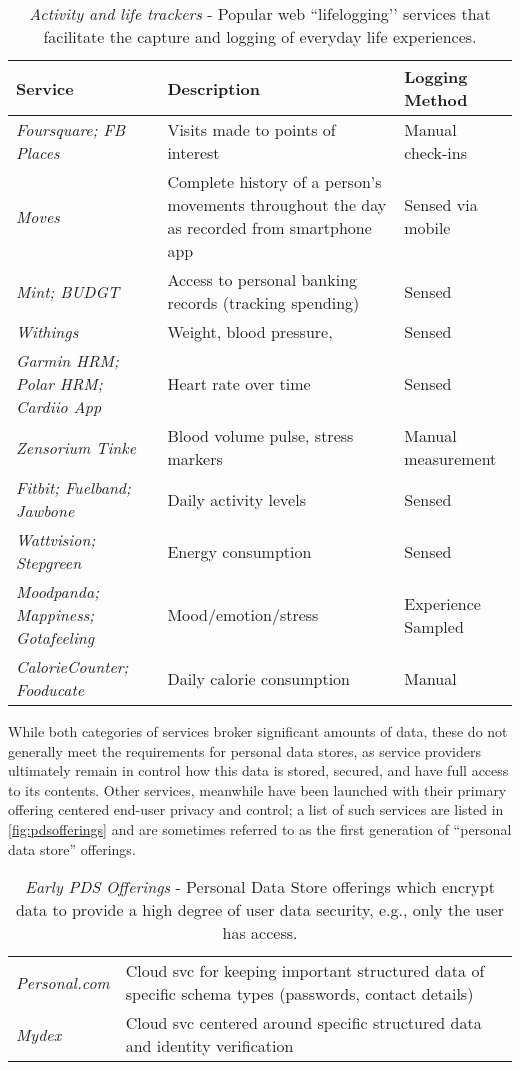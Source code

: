 \documentclass[graybox]{svmult}
\begin{document}
\begin{table}
\begin{tabular}{p{3cm} p{4.5cm} p{2.54cm}}
Service & Description & Logging Method \\
\hline
\emph{Foursquare; FB Places} & Visits made to points of interest & Manual check-ins \\
\emph{Moves} & Complete history of a person's movements throughout the day as recorded from smartphone app  & Sensed via mobile \\ 
\emph{Mint; BUDGT} & Access to personal banking records (tracking spending) & Sensed\\
\emph{Withings} & Weight, blood pressure,& Sensed \\
\emph{Garmin HRM; Polar HRM; Cardiio App} & Heart rate over time & Sensed \\
\emph{Zensorium Tinke} & Blood volume pulse, stress markers & Manual measurement \\
\emph{Fitbit; Fuelband; Jawbone} & Daily activity levels & Sensed \\ 
\emph{Wattvision; Stepgreen} & Energy consumption & Sensed \\
\emph{Moodpanda; Mappiness; Gotafeeling} & Mood/emotion/stress & Experience Sampled \\
\emph{CalorieCounter; Fooducate} & Daily calorie consumption & Manual \\
\end{tabular}
\caption{\emph{Activity and life trackers} - Popular web ``lifelogging’’ services that facilitate the capture and logging of everyday life experiences. }
\label{fig:aboutme}
\end{table}

While both categories of services broker significant amounts of data, these do not generally meet the requirements for personal data stores, as service providers ultimately remain in control how this data is stored, secured, and have full access to its contents.  Other services, meanwhile have been launched with their primary offering centered end-user privacy and control; a list of such services are listed in \ref{fig:pdsofferings} and are sometimes referred to as the first generation of ``personal data store'' offerings.

\begin{table}
\begin{tabular}{l p{8.5cm}}
\emph{Personal.com} & Cloud svc for keeping important structured data of specific schema types (passwords, contact details)  \\
\emph{Mydex} & Cloud svc centered around specific structured data and identity verification  \\
\end{tabular}
\caption{\emph{Early PDS Offerings} - Personal Data Store offerings which encrypt data to provide a high degree of user data security, e.g., only the user has access.}
\label{fig:pdsofferingsp}
\end{table}
\end{document}
